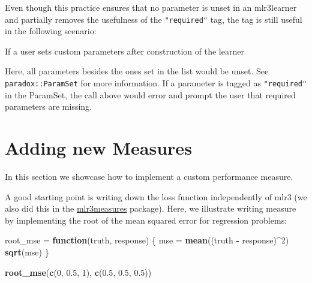 \documentclass[]{scrbook}
\newenvironment{Shaded}{\begin{snugshade}}{\end{snugshade}}
\newcommand{\ControlFlowTok}[1]{\textcolor[rgb]{0.13,0.29,0.53}{\textbf{#1}}}
\newcommand{\DecValTok}[1]{\textcolor[rgb]{0.00,0.00,0.81}{#1}}
\newcommand{\ErrorTok}[1]{\textcolor[rgb]{0.64,0.00,0.00}{\textbf{#1}}}
\newcommand{\FloatTok}[1]{\textcolor[rgb]{0.00,0.00,0.81}{#1}}
\newcommand{\KeywordTok}[1]{\textcolor[rgb]{0.13,0.29,0.53}{\textbf{#1}}}
\newcommand{\NormalTok}[1]{#1}
\newcommand{\OperatorTok}[1]{\textcolor[rgb]{0.81,0.36,0.00}{\textbf{#1}}}
\newcommand{\StringTok}[1]{\textcolor[rgb]{0.31,0.60,0.02}{#1}}
\renewenvironment{Shaded} {\begin{snugshade}\small} {\end{snugshade}}
\begin{document}
Even though this practice ensures that no parameter is unset in an mlr3learner and partially removes the usefulness of the \texttt{"required"} tag, the tag is still useful in the following scenario:

If a user sets custom parameters after construction of the learner

\begin{Shaded}
\end{Shaded}

Here, all parameters besides the ones set in the list would be unset.
See \texttt{paradox::ParamSet} for more information.
If a parameter is tagged as \texttt{"required"} in the ParamSet, the call above would error and prompt the user that required parameters are missing.

\hypertarget{extending-measures}{%
\section{Adding new Measures}\label{extending-measures}}

In this section we showcase how to implement a custom performance measure.

A good starting point is writing down the loss function independently of mlr3 (we also did this in the \href{https://mlr3measures.mlr-org.com}{mlr3measures} package).
Here, we illustrate writing measure by implementing the root of the mean squared error for regression problems:

\begin{Shaded}
\begin{Highlighting}[]
\NormalTok{root_mse =}\StringTok{ }\ControlFlowTok{function}\NormalTok{(truth, response) \{}
\NormalTok{  mse =}\StringTok{ }\KeywordTok{mean}\NormalTok{((truth }\OperatorTok{-}\StringTok{ }\NormalTok{response)}\OperatorTok{^}\DecValTok{2}\NormalTok{)}
  \KeywordTok{sqrt}\NormalTok{(mse)}
\NormalTok{\}}

\KeywordTok{root_mse}\NormalTok{(}\KeywordTok{c}\NormalTok{(}\DecValTok{0}\NormalTok{, }\FloatTok{0.5}\NormalTok{, }\DecValTok{1}\NormalTok{), }\KeywordTok{c}\NormalTok{(}\FloatTok{0.5}\NormalTok{, }\FloatTok{0.5}\NormalTok{, }\FloatTok{0.5}\NormalTok{))}
\end{Highlighting}
\end{Shaded}
\end{document}
